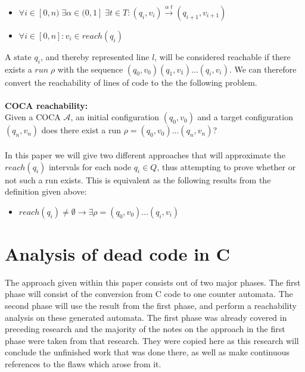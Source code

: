 \documentclass[12pt]{article}
\begin{document}
\begin{itemize}
	\item $\forall i \in [0, n)\;\exists \alpha \in (0, 1]\;\exists t \in T: (q_i, v_i) \xrightarrow{\alpha\;t}(q_{i+1}, v_{i+1})$
	\item $\forall i \in [0, n]: v_i \in reach(q_i)$
\end{itemize}

A state $q_i$, and thereby represented line $l$, will be considered reachable if there exists a $run\;\rho$ with the sequence $(q_0, v_0)(q_1, v_1)...(q_i, v_i)$. We can therefore convert the reachability of lines of code to the the following problem. \\
\\
\noindent
\textbf{COCA reachability:} \\
Given a COCA $\mathcal{A}$, an initial configuration $(q_0, v_0)$ and a target configuration $(q_n, v_n)$ does there exist a run $\rho = (q_0, v_0) ... (q_n, v_n)$?\\
\\
In this paper we will give two different approaches that will approximate the $reach(q_i)$ intervals for each node $q_i \in Q$, thus attempting to prove whether or not such a run exists. This is equivalent as the following results from the definition given above:

\begin{itemize}
	\item $reach(q_i) \neq \emptyset \rightarrow \exists \rho = (q_0, v_0) ... (q_i, v_i)$
\end{itemize}

\section{Analysis of dead code in C}
The approach given within this paper consists out of two major phases. The first phase will consist of the conversion from C code to one counter automata. The second phase will use the result from the first phase, and perform a reachability analysis on these generated automata. The first phase was already covered in preceding research and the majority of the notes on the approach in the first phase were taken from that research. They were copied here as this research will conclude the unfinished work that was done there, as well as make continuous references to the flaws which arose from it.
\end{document}

